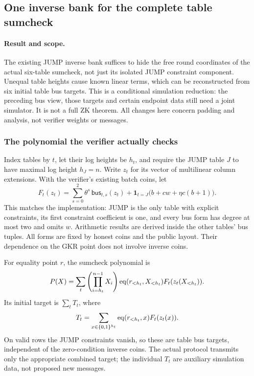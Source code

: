 \subsection{One inverse bank for the complete table sumcheck}\label{note:zk-table-batch}

\paragraph{Result and scope.} The existing JUMP inverse bank suffices to hide the free round coordinates of the actual six-table sumcheck, not just its isolated JUMP constraint component. Unequal table heights cause known linear terms, which can be reconstructed from six initial table bus targets. This is a conditional simulation reduction: the preceding bus view, those targets and certain endpoint data still need a joint simulator. It is not a full ZK theorem. All changes here concern padding and analysis, not verifier weights or messages.

\subsubsection{The polynomial the verifier actually checks}

Index tables by $t$, let their log heights be $h_t$, and require the JUMP table $J$ to have maximal log height $h_J=n$. Write $z_t$ for its vector of multilinear column extensions. With the verifier's existing batch coins, let
\[
 F_t(z_t)=\sum_{s=0}^2\theta^s\,\mathsf{bus}_{t,s}(z_t)
 +\mathbf1_{t=J}\bigl(b+cw+\eta c(b+1)\bigr).
\]
This matches the implementation: JUMP is the only table with explicit constraints, its first constraint coefficient is one, and every bus form has degree at most two and omits $w$. Arithmetic results are derived inside the other tables' bus tuples. All forms are fixed by honest coins and the public layout. Their dependence on the GKR point does not involve inverse coins.

For equality point $r$, the sumcheck polynomial is
\begin{equation}\label{eq:batch-poly}
 P(X)=\sum_t\left(\prod_{i=h_t}^{n-1}X_i\right)
 \operatorname{eq}(r_{<h_t},X_{<h_t})F_t(z_t(X_{<h_t})).
\end{equation}
Its initial target is $\sum_t T_t$, where
\[
 T_t=\sum_{x\in\{0,1\}^{h_t}}\operatorname{eq}(r_{<h_t},x)F_t(z_t(x)).
\]
On valid rows the JUMP constraints vanish, so these are table bus targets, independent of the zero-condition inverse coins. The actual protocol transmits only the appropriate combined target; the individual $T_t$ are auxiliary simulation data, not proposed new messages.

